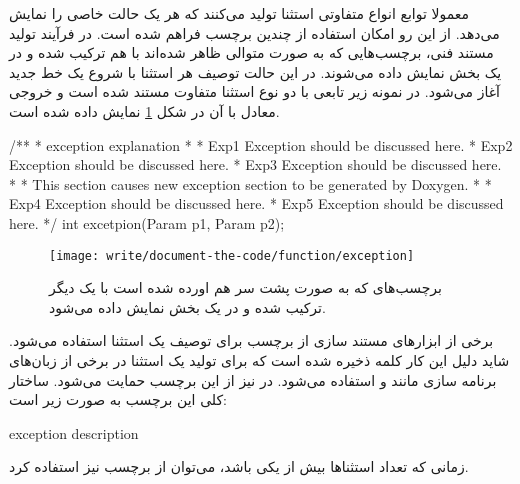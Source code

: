 معمولا توابع انواع متفاوتی استثنا تولید می‌کنند که هر یک حالت خاصی را نمایش می‌دهد.
از این رو امکان استفاده از چندین برچسب  فراهم شده است.
در فرآیند تولید مستند فنی، برچسب‌هایی که به صورت متوالی ظاهر شده‌اند با هم ترکیب
شده و در یک بخش نمایش داده می‌شوند.
در این حالت توصیف هر استثنا با شروع یک خط جدید آغاز می‌شود.
در نمونه زیر تابعی با دو نوع استثنا متفاوت مستند شده است و خروجی معادل با آن در شکل 
\ref{write/document-the-code/function/exception} نمایش داده شده است.
\begin{C++}
/**
 * \brief exception explanation
 *
 * \exception Exp1 Exception should be discussed here.
 * \exception Exp2 Exception should be discussed here.
 * \exception Exp3 Exception should be discussed here.
 *
 * This section causes new exception section to be generated by Doxygen.
 *
 * \exception Exp4 Exception should be discussed here.
 * \exception Exp5 Exception should be discussed here.
 */
int excetpion(Param p1, Param p2);
\end{C++} 
\begin{figure}
	\centering
	\texttt{[image: write/document-the-code/function/exception]}
	\caption[استثناهای یک تابع]{
		برچسب‌های  که به صورت پشت سر هم اورده شده است با یک دیگر ترکیب شده 
		و در یک بخش نمایش داده می‌شود.
	}
	\label{write/document-the-code/function/exception}
\end{figure}

برخی از ابزارهای مستند سازی از برچسب  برای توصیف یک استثنا استفاده می‌شود.
شاید دلیل این کار کلمه ذخیره شده  است که برای تولید یک استثنا در برخی
از زبان‌های برنامه سازی مانند  و  استفاده می‌شود.
در  نیز از این برچسب حمایت می‌شود.
ساختار کلی این برچسب به صورت زیر است:
\begin{C++}
 { exception description }
\end{C++}

زمانی که تعداد استثناها بیش از یکی باشد، می‌توان از برچسب  نیز استفاده کرد.


